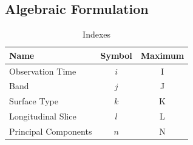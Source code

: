 \documentclass[iop,numberedappendix,apj]{emulateapj}
\begin{document}
\subsection{Algebraic Formulation}
\label{ss:model}


\begin{table}[b]
\caption{Indexes}
\begin{center}
\begin{tabular}{lcc} \hline \hline
Name & Symbol & Maximum \\ \hline
Observation Time & $i$ & I \\
Band & $j$ & J  \\
Surface Type & $k$ & K  \\
Longitudinal Slice  & $l$ & L \\ 
Principal Components & $n$ & N \\ \hline
\end{tabular}
\end{center}
\label{tab:index}
\end{table}%
\end{document}
